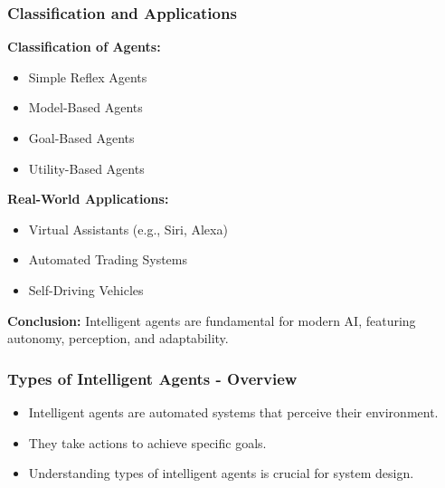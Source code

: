 \documentclass[aspectratio=169]{beamer}
\begin{document}
\begin{frame}[fragile]
    \frametitle{Classification and Applications}
    \textbf{Classification of Agents:}
    \begin{itemize}
        \item Simple Reflex Agents
        \item Model-Based Agents
        \item Goal-Based Agents
        \item Utility-Based Agents
    \end{itemize}

    \textbf{Real-World Applications:}
    \begin{itemize}
        \item Virtual Assistants (e.g., Siri, Alexa)
        \item Automated Trading Systems
        \item Self-Driving Vehicles
    \end{itemize}
    
    \textbf{Conclusion:} Intelligent agents are fundamental for modern AI, featuring autonomy, perception, and adaptability.
\end{frame}

\begin{frame}[fragile]
    \frametitle{Types of Intelligent Agents - Overview}
    \begin{itemize}
        \item Intelligent agents are automated systems that perceive their environment.
        \item They take actions to achieve specific goals.
        \item Understanding types of intelligent agents is crucial for system design.
    \end{itemize}
\end{frame}
\end{document}

